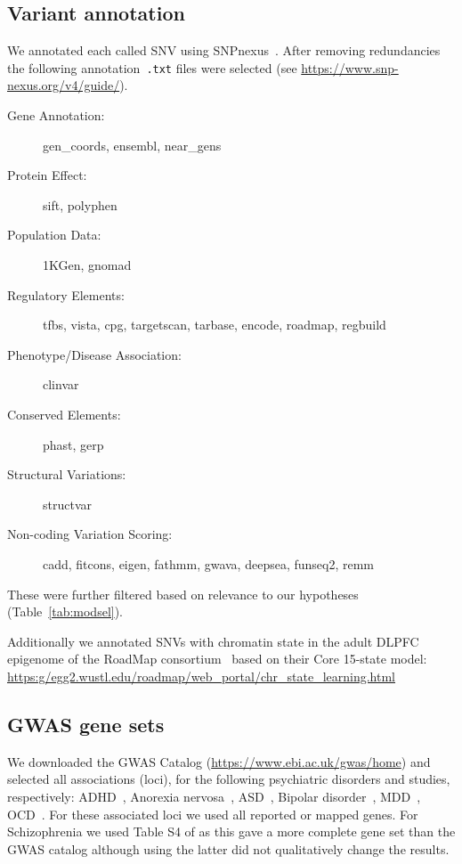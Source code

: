 \documentclass[letterpaper]{article}
\begin{document}
\subsection*{Variant annotation}

We annotated each called SNV using SNPnexus~\citep{Oscanoa2020}.  After
removing redundancies the following annotation~\texttt{.txt} files were
selected (see \url{https://www.snp-nexus.org/v4/guide/}).

\begin{description}
\item[Gene Annotation:] gen\_coords, ensembl, near\_gens
\item[Protein Effect:] sift, polyphen
\item[Population Data:] 1KGen, gnomad
\item[Regulatory Elements:] tfbs, vista, cpg, targetscan, tarbase, encode, roadmap, regbuild
\item[Phenotype/Disease Association:] clinvar
\item[Conserved Elements:] phast, gerp
\item[Structural Variations:] structvar
\item[Non-coding Variation Scoring:] cadd, fitcons, eigen, fathmm, gwava, deepsea, funseq2, remm
\end{description}

These were further filtered based on relevance to our
hypotheses (Table~\ref{tab:modsel}).

Additionally we annotated SNVs with chromatin state in the adult DLPFC
epigenome of the RoadMap consortium~\citep{Kundaje2015} based on their
Core 15-state model:\\
\url{https:g/egg2.wustl.edu/roadmap/web_portal/chr_state_learning.html}


\subsection*{GWAS gene sets}

We downloaded the GWAS Catalog (\url{https://www.ebi.ac.uk/gwas/home}) and
selected all associations (loci), for the following psychiatric disorders and
studies, respectively: ADHD~\citep{Demontis2019}, Anorexia
nervosa~\citep{Watson2019}, ASD~\citep{Grove2019}, Bipolar
disorder~\citep{Stahl2019}, MDD~\citep{Howard2019}, OCD~\citep{Smit2020}.  For
these associated loci we used all reported or mapped genes.
For Schizophrenia we used Table S4 of \cite{Pardinas2018} as this gave
a more complete gene set than the GWAS catalog although using the latter did
not qualitatively change the results.
\end{document}
